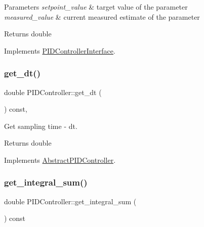 \begin{DoxyParams}{Parameters}
{\em setpoint\+\_\+value} & target value of the parameter \\
\hline
{\em measured\+\_\+value} & current measured estimate of the parameter \\
\hline
\end{DoxyParams}
\begin{DoxyReturn}{Returns}
double 
\end{DoxyReturn}


Implements \hyperlink{classPIDControllerInterface_a6b5340968cb9d235cf3b52bd61c973e1}{P\+I\+D\+Controller\+Interface}.

\mbox{\label{classPIDController_a338490568fd2de02c4e1eea130a816c1}} 
\subsubsection{\texorpdfstring{get\+\_\+dt()}{get\_dt()}}
{\footnotesize\ttfamily double P\+I\+D\+Controller\+::get\+\_\+dt (\begin{DoxyParamCaption}{ }\end{DoxyParamCaption}) const\hspace{0.3cm}{\ttfamily [override]}, {\ttfamily [virtual]}}



Get sampling time -\/ dt. 

\begin{DoxyReturn}{Returns}
double 
\end{DoxyReturn}


Implements \hyperlink{classAbstractPIDController}{Abstract\+P\+I\+D\+Controller}.

\mbox{\label{classPIDController_a9f5ea16a313044807fbd23135646c88e}} 
\subsubsection{\texorpdfstring{get\+\_\+integral\+\_\+sum()}{get\_integral\_sum()}}
{\footnotesize\ttfamily double P\+I\+D\+Controller\+::get\+\_\+integral\+\_\+sum (\begin{DoxyParamCaption}{ }\end{DoxyParamCaption}) const\hspace{0.3cm}{\ttfamily [virtual]}}



